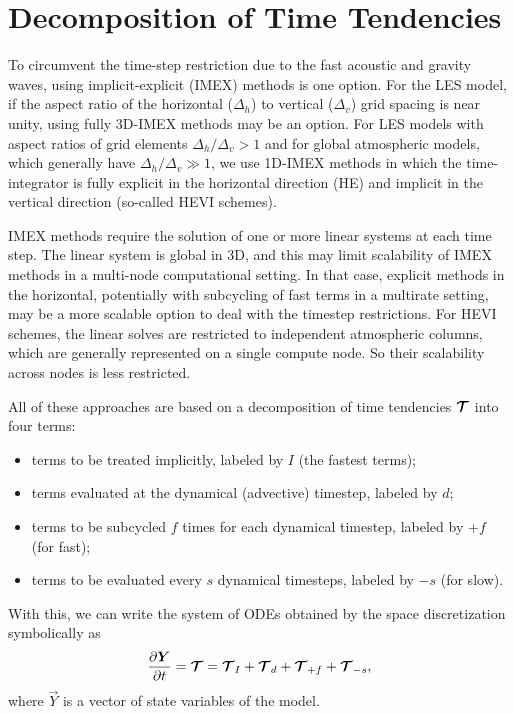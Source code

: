 \documentclass{report}
\begin{document}
\section{Decomposition of Time Tendencies}

To circumvent the time-step restriction due to the fast acoustic and gravity waves, using implicit-explicit (IMEX) methods is one option. For the LES model, if the aspect ratio of the horizontal ($\Delta_h$) to vertical ($\Delta_v$) grid spacing is near unity, using fully 3D-IMEX methods may be an option.  For LES models with aspect ratios of grid elements $\Delta_h/\Delta_v > 1$ and for global atmospheric models, which generally have $\Delta_h/\Delta_v \gg 1$, we use 1D-IMEX methods in which the time-integrator is fully explicit in the horizontal direction (HE) and implicit in the vertical direction (so-called HEVI schemes). 

IMEX methods require the solution of one or more linear systems at each time step. The linear system is global in 3D, and this may limit scalability of IMEX methods in a multi-node computational setting. In that case, explicit methods in the horizontal, potentially with subcycling of fast terms in a multirate setting, may be a more scalable option to deal with the timestep restrictions. For HEVI schemes, the linear solves are restricted to independent atmospheric columns, which are generally represented on a single compute node. So their scalability across nodes is less restricted.

All of these approaches are based on a decomposition of time tendencies $\boldsymbol{{\mathcal{T}}}$ into four terms: 
\begin{itemize}
    \item terms to be treated implicitly, labeled by $I$ (the fastest terms);
    \item terms evaluated at the dynamical (advective) timestep, labeled by $d$;
    \item terms to be subcycled $f$ times for each dynamical timestep, labeled by $+f$ (for fast);
    \item terms to be evaluated every $s$ dynamical timesteps, labeled by $-s$ (for slow).
\end{itemize}
With this, we can write the system of ODEs obtained by the space discretization symbolically as
\[
\frac{\partial \boldsymbol{{Y}}}{\partial t} = \boldsymbol{{\mathcal{T}}}  = \boldsymbol{{\mathcal{T}}}_{I} + \boldsymbol{{\mathcal{T}}}_{d} + \boldsymbol{{\mathcal{T}}}_{+f} + \boldsymbol{{\mathcal{T}}}_{-s},
\]
where $\vec{Y}$ is a vector of state variables of the model. 
\end{document}
